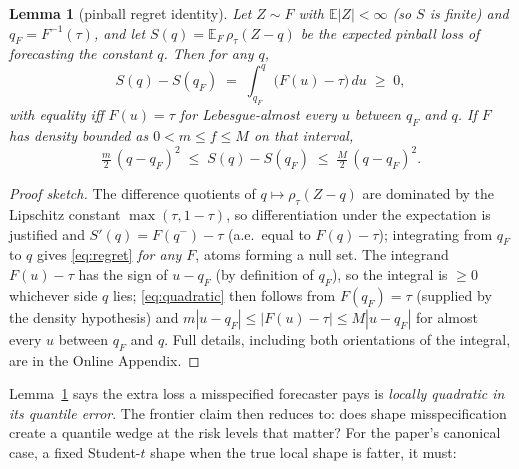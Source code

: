 \documentclass[11pt]{article}
\newtheorem{lemma}{Lemma}
\theoremstyle{remark}
\begin{document}
\begin{lemma}[pinball regret identity]\label{lem:regret}
Let $Z \sim F$ with $\mathbb{E}|Z| < \infty$ (so $S$ is finite) and
$q_F = F^{-1}(\tau)$, and let
$S(q) = \mathbb{E}_F\,\rho_\tau(Z - q)$ be the expected pinball loss of
forecasting the constant $q$. Then for any $q$,
\begin{equation}
S(q) - S(q_F) \;=\; \int_{q_F}^{q} \big(F(u) - \tau\big)\,du \;\ge\; 0,
\label{eq:regret}
\end{equation}
with equality iff $F(u) = \tau$ for Lebesgue-almost every $u$ between $q_F$ and $q$.
If $F$ has density bounded as $0 < m \le f \le M$ on that interval,
\begin{equation}
\tfrac{m}{2}\,(q - q_F)^2 \;\le\; S(q) - S(q_F) \;\le\;
\tfrac{M}{2}\,(q - q_F)^2 .
\label{eq:quadratic}
\end{equation}
\end{lemma}
\begin{proof}[Proof sketch]
The difference quotients of $q\mapsto\rho_\tau(Z-q)$ are dominated by
the Lipschitz constant $\max(\tau,1-\tau)$, so differentiation under the
expectation is justified and $S'(q)=F(q^-)-\tau$ (a.e.\ equal to
$F(q)-\tau$); integrating from $q_F$ to $q$ gives \eqref{eq:regret}
\emph{for any $F$}, atoms forming a null set. The integrand
$F(u)-\tau$ has the sign of $u-q_F$ (by definition of $q_F$), so the
integral is $\ge 0$ whichever side $q$ lies; \eqref{eq:quadratic} then
follows from $F(q_F)=\tau$ (supplied by the density hypothesis) and
$m|u-q_F|\le |F(u)-\tau|\le M|u-q_F|$ for almost every $u$ between
$q_F$ and $q$. Full details, including both
orientations of the integral, are in the Online Appendix.
\end{proof}

Lemma~\ref{lem:regret} says the extra loss a misspecified forecaster
pays is \emph{locally quadratic in its quantile error}. The frontier claim then
reduces to: does shape misspecification create a quantile wedge at the
risk levels that matter? For the paper's canonical case, a fixed Student-$t$ shape when the true local shape is fatter, it must:
\end{document}
